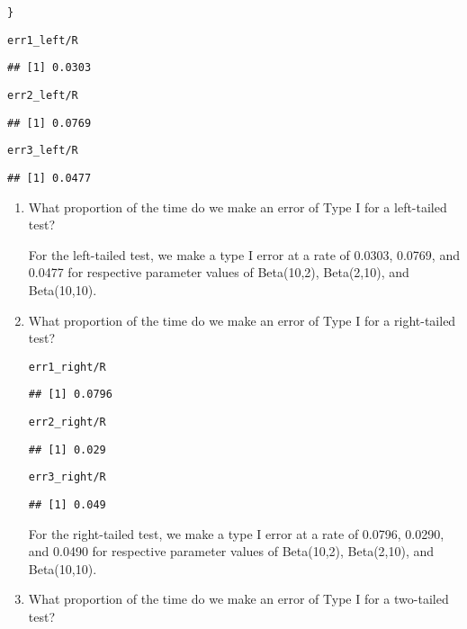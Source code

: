 \documentclass{article}\usepackage[]{graphicx}\usepackage[]{xcolor}
\makeatletter
\newcommand{\hlopt}[1]{\textcolor[rgb]{0,0,0}{#1}}%
\newcommand{\hldef}[1]{\textcolor[rgb]{0.345,0.345,0.345}{#1}}%
\newenvironment{kframe}{%
 \def\at@end@of@kframe{}%
 \ifinner\ifhmode%
  \def\at@end@of@kframe{\end{minipage}}%
  \begin{minipage}{\columnwidth}%
 \fi\fi%
 \def\FrameCommand##1{\hskip\@totalleftmargin \hskip-\fboxsep
 \colorbox{shadecolor}{##1}\hskip-\fboxsep
     \hskip-\linewidth \hskip-\@totalleftmargin \hskip\columnwidth}%
 \MakeFramed {\advance\hsize-\width
   \@totalleftmargin\z@ \linewidth\hsize
   \@setminipage}}%
 {\par\unskip\endMakeFramed%
 \at@end@of@kframe}
\newenvironment{knitrout}{}{} %
\makeatother
\begin{document}
\begin{enumerate}
\begin{knitrout}
\begin{kframe}
\begin{alltt}
\hldef{\}}

\hldef{err1_left}\hlopt{/}\hldef{R}
\end{alltt}
\begin{verbatim}
## [1] 0.0303
\end{verbatim}
\begin{alltt}
\hldef{err2_left}\hlopt{/}\hldef{R}
\end{alltt}
\begin{verbatim}
## [1] 0.0769
\end{verbatim}
\begin{alltt}
\hldef{err3_left}\hlopt{/}\hldef{R}
\end{alltt}
\begin{verbatim}
## [1] 0.0477
\end{verbatim}
\end{kframe}
\end{knitrout}

  \begin{enumerate}
    \item What proportion of the time do we make an error of Type I for a
    left-tailed test?
 
 For the left-tailed test, we make a type I error at a rate of 0.0303, 0.0769, and 0.0477 for respective parameter values of Beta(10,2), Beta(2,10), and Beta(10,10).

    \item What proportion of the time do we make an error of Type I for a
    right-tailed test?
\begin{knitrout}\scriptsize
{}\color{fgcolor}\begin{kframe}
\begin{alltt}
\hldef{err1_right}\hlopt{/}\hldef{R}
\end{alltt}
\begin{verbatim}
## [1] 0.0796
\end{verbatim}
\begin{alltt}
\hldef{err2_right}\hlopt{/}\hldef{R}
\end{alltt}
\begin{verbatim}
## [1] 0.029
\end{verbatim}
\begin{alltt}
\hldef{err3_right}\hlopt{/}\hldef{R}
\end{alltt}
\begin{verbatim}
## [1] 0.049
\end{verbatim}
\end{kframe}
\end{knitrout}
     For the right-tailed test, we make a type I error at a rate of 0.0796, 0.0290, and 0.0490 for respective parameter values of Beta(10,2), Beta(2,10), and Beta(10,10).
    \item What proportion of the time do we make an error of Type I for a
    two-tailed test?
    

\end{enumerate}
\end{enumerate}
\end{document}

